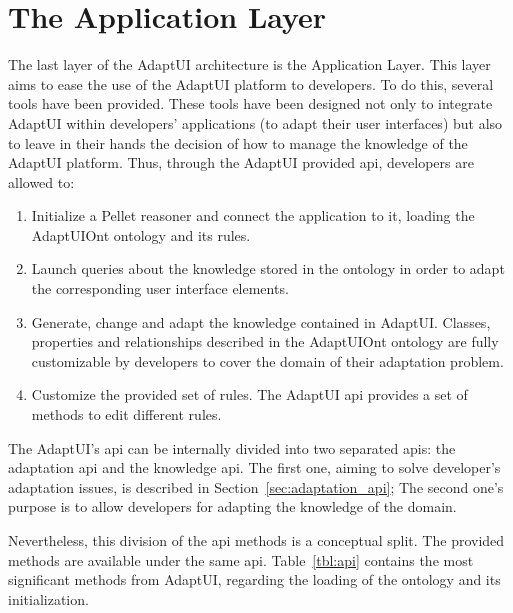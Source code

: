 \section{The Application Layer}
\label{sec:application_layer}

The last layer of the AdaptUI architecture is the Application Layer. This layer
aims to ease the use of the AdaptUI platform to developers. To do this, several
tools have been provided. These tools have been designed not only to integrate
AdaptUI within developers' applications (to adapt their user interfaces) but also
to leave in their hands the decision of how to manage the knowledge of the AdaptUI
platform. Thus, through the AdaptUI provided \ac{api}, developers are allowed to:

\begin{enumerate}[label=\alph*)]
 \item Initialize a Pellet reasoner and connect the application to it, loading
 the AdaptUIOnt ontology and its rules.
 
 \item Launch queries about the knowledge stored in the ontology in order to
 adapt the corresponding user interface elements.
 
 \item Generate, change and adapt the knowledge contained in AdaptUI. Classes,
 properties and relationships described in the AdaptUIOnt ontology are fully
 customizable by developers to cover the domain of their adaptation problem.
 
 \item Customize the provided set of rules. The AdaptUI \ac{api} provides a set of
 methods to edit different rules.
\end{enumerate}

The AdaptUI's \ac{api} can be internally divided into two separated \acp{api}:
the adaptation \ac{api} and the knowledge \ac{api}. The first one, aiming to solve 
developer's adaptation issues, is described in Section~\ref{sec:adaptation_api};
The second one's purpose is to allow developers for adapting the knowledge of the 
domain.

Nevertheless, this division of the \ac{api} methods is a conceptual split. The
provided methods are available under the same \ac{api}. Table~\ref{tbl:api} 
contains the most significant methods from AdaptUI, regarding the loading of the 
ontology and its initialization.

